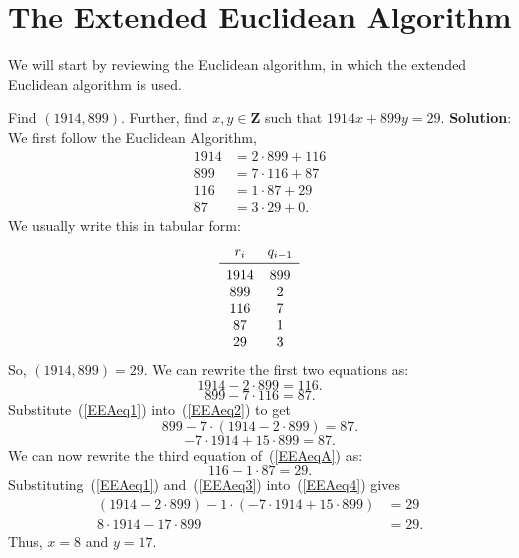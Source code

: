 \section{The Extended Euclidean Algorithm}
We will start by reviewing the Euclidean algorithm, in which the extended
Euclidean algorithm is used.
\begin{Example}{}{}
    Find $ (1914,899) $. Further, find $ x,y\in\mathbf{Z} $ such that $ 1914x+899y=29 $.
    \tcblower{}
    \textbf{Solution}: We first follow the Euclidean Algorithm,
    \begin{equation}\label{EEAeqA}
        \begin{aligned}
            1914 & =2\cdot 899+116 \\
            899  & =7\cdot 116+87  \\
            116  & =1\cdot 87+29   \\
            87   & =3\cdot 29+0.
        \end{aligned}
    \end{equation}
    We usually write this in tabular form:
    \[ \begin{array}{cc}
            r_i  & q_{i-1} \\
            \midrule
            1914 & 899     \\
            899  & 2       \\
            116  & 7       \\
            87   & 1       \\
            29   & 3
        \end{array} \]
    So, $ (1914,899)=29 $. We can rewrite the first two equations as:
    \begin{equation}\label{EEAeq1}
        1914-2\cdot 899=116.
    \end{equation}
    \begin{equation}\label{EEAeq2}
        899-7\cdot 116=87.
    \end{equation}
    Substitute~(\ref{EEAeq1}) into~(\ref{EEAeq2}) to get
    \[ 899-7\cdot(1914-2\cdot 899)=87. \]
    \begin{equation}\label{EEAeq3}
        -7\cdot 1914+15\cdot 899=87.
    \end{equation}
    We can now rewrite the third equation of~(\ref{EEAeqA}) as:
    \begin{equation}\label{EEAeq4}
        116-1\cdot 87=29.
    \end{equation}
    Substituting~(\ref{EEAeq1}) and~(\ref{EEAeq3}) into~(\ref{EEAeq4}) gives
    \begin{align*}
        (1914-2\cdot 899)-1\cdot(-7\cdot 1914+15\cdot 899) & =29  \\
        8\cdot 1914 -17\cdot 899                           & =29.
    \end{align*}
    Thus, $x = 8$ and $y = 17$.
\end{Example}

